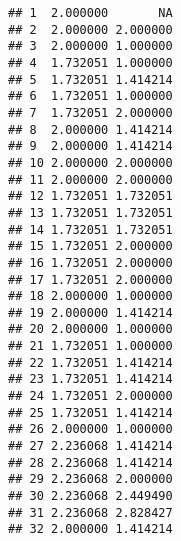 \documentclass[
]{article}
\begin{document}
\begin{verbatim}
## 1  2.000000       NA
## 2  2.000000 2.000000
## 3  2.000000 1.000000
## 4  1.732051 1.000000
## 5  1.732051 1.414214
## 6  1.732051 1.000000
## 7  1.732051 2.000000
## 8  2.000000 1.414214
## 9  2.000000 1.414214
## 10 2.000000 2.000000
## 11 2.000000 2.000000
## 12 1.732051 1.732051
## 13 1.732051 1.732051
## 14 1.732051 1.732051
## 15 1.732051 2.000000
## 16 1.732051 2.000000
## 17 1.732051 2.000000
## 18 2.000000 1.000000
## 19 2.000000 1.414214
## 20 2.000000 1.000000
## 21 1.732051 1.000000
## 22 1.732051 1.414214
## 23 1.732051 1.414214
## 24 1.732051 2.000000
## 25 1.732051 1.414214
## 26 2.000000 1.000000
## 27 2.236068 1.414214
## 28 2.236068 1.414214
## 29 2.236068 2.000000
## 30 2.236068 2.449490
## 31 2.236068 2.828427
## 32 2.000000 1.414214
\end{verbatim}
\end{document}
